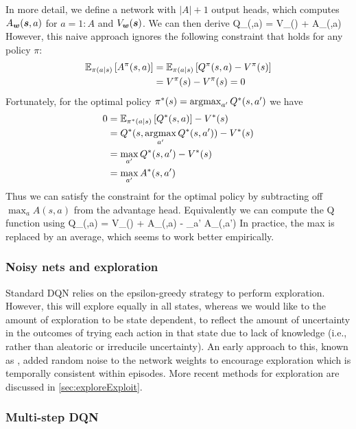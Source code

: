 In more detail, we define a network with $|A|+1$ output heads,
which computes  $A_{\vw}(\vs,a)$ for $a=1:A$ and
$V_{\vw}(\vs)$. We can then derive
\be
Q_{\vw}(\vs,a) = V_{\vw}(\vs) + A_{\vw}(\vs,a)
\ee
However, this naive approach ignores the following constraint
that holds for any policy $\pi$:
\begin{align}
\expectQ{A^{\pi}(s,a)}{\pi(a|s)}
&= \expectQ{Q^{\pi}(s,a) - V^{\pi}(s)}{\pi(a|s)} \\
&= V^{\pi}(s)  - V^{\pi}(s) = 0
\end{align}
Fortunately, for the optimal policy
$\pi^*(s) = \argmax_{a'} Q^*(s,a')$ we have
\begin{align}
0 
&= \expectQ{Q^*(s,a)}{\pi^*(a|s)}  - V^*(s) \\
&= Q^*(s, \argmax_{a'} Q^*(s,a')) - V^*(s) \\
&= \max_{a'} Q^*(s,a') - V^*(s) \\
&= \max_{a'} A^*(s,a')
\end{align}
Thus we can satisfy the constraint for the optimal policy
by subtracting off   $\max_a A(s,a)$ from the advantage head.
Equivalently we can compute the Q function using 
\be
Q_{\vw}(\vs,a) = V_{\vw}(\vs) + A_{\vw}(\vs,a) - \max_{a'} A_{\vw}(\vs,a')
\ee
In practice, the max is replaced by an average,
which seems to work better empirically.

\subsubsection{Noisy nets and exploration}
\label{sec:noisyDQN}
\label{sec:noisyNets}

Standard DQN relies on the epsilon-greedy strategy to perform exploration.
However, this will explore equally in all states,
whereas we would like to the amount of exploration
to be state dependent, to reflect the amount of uncertainty
in the outcomes of trying each action in that state
due to lack of knowledge (i.e., 
rather than aleatoric or irreducile uncertainty).
An early approach to this,
known as   \citep{Fortunato2018},
added random noise to
the network weights to encourage exploration which is
temporally consistent within episodes.
More recent methods for exploration
are discussed in \cref{sec:exploreExploit}.


\subsubsection{Multi-step DQN}
\label{sec:nsteps}

